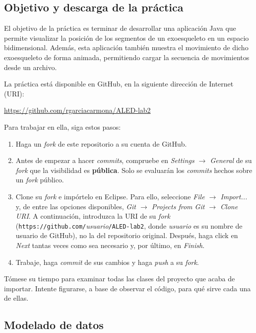 \documentclass[10pt,a4paper,spanish]{article}
\begin{document}
\subsection{Objetivo y descarga de la práctica}

El objetivo de la práctica es terminar de desarrollar una aplicación Java que permite visualizar la posición de los segmentos de un exoesqueleto en un espacio bidimensional. Además, esta aplicación también muestra el movimiento de dicho exoesqueleto de forma animada, permitiendo cargar la secuencia de movimientos desde un archivo.

La práctica está disponible en GitHub, en la siguiente dirección de Internet (URI):

\href{https://github.com/rgarciacarmona/ALED-lab2}{https://github.com/rgarciacarmona/ALED-lab2}

Para trabajar en ella, siga estos pasos:

\begin{enumerate}
    \item Haga un \textit{fork} de este repositorio a su cuenta de GitHub.
    \item Antes de empezar a hacer \textit{commits}, compruebe en \textit{Settings $\to$ General} de su \textit{fork} que la visibilidad es \textbf{pública}. Solo se evaluarán los \textit{commits} hechos sobre un \textit{fork} público.
    \item Clone su \textit{fork} e impórtelo en Eclipse. Para ello, seleccione \textit{File $\to$ Import...} y, de entre las opciones disponibles, \textit{Git $\to$ Projects from Git $\to$ Clone URI}. A continuación, introduzca la URI de su \textit{fork} (\texttt{https://github.com/}\textit{usuario}\texttt{/ALED-lab2}, donde \textit{usuario} es su nombre de usuario de GitHub), no la del repositorio original. Después, haga click en \textit{Next} tantas veces como sea necesario y, por último, en \textit{Finish}.
    \item Trabaje, haga \textit{commit} de sus cambios y haga \textit{push} a su \textit{fork}.
\end{enumerate}

Tómese su tiempo para examinar todas las clases del proyecto que acaba de importar. Intente figurarse, a base de observar el código, para qué sirve cada una de ellas.

\subsection{Modelado de datos}
\end{document}
